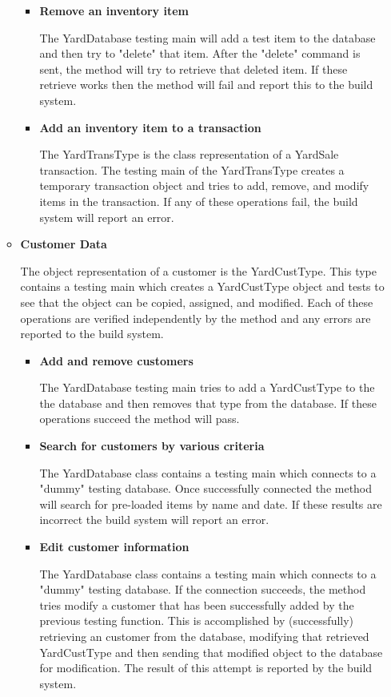 \documentclass{report}
\begin{document}
\begin{itemize}
\begin{itemize}
\begin{itemize}
                    \item {\textbf{Remove an inventory item}}

		    The YardDatabase testing main will add a test item to the database and then try to "delete" that item.
		    After the "delete" command is sent, the method will try to retrieve that deleted item. If these retrieve works
		    then the method will fail and report this to the build system.

		\item {\textbf{Add an inventory item to a transaction}}

		The YardTransType is the class representation of a YardSale transaction.  The testing main of the
		YardTransType creates a temporary transaction object and tries to add, remove, and modify items
		in the transaction.  If any of these operations fail, the build system will report an error.

                \end{itemize}
                \item{\textbf{Customer Data}}

		The object representation of a customer is the YardCustType.  This type contains a testing main which
		creates a YardCustType object and tests to see that the object can be copied, assigned, and modified.
		Each of these operations are verified independently by the method and any errors are reported to the build
		system.

                \begin{itemize}
                    \item{\textbf{Add and remove customers}}

		    The YardDatabase testing main tries to add a YardCustType to the the database and then removes that
		    type from the database.  If these operations succeed the method will pass.

                    \item{\textbf{Search for customers by various criteria}}

		The YardDatabase class contains a testing main which connects to a "dummy" testing database.
		 Once successfully connected the method will search for pre-loaded items by name and date.
		    If these results are incorrect the build system will report an error.

                    \item{\textbf{Edit customer information}}

		    The YardDatabase class contains a testing main which connects to a "dummy" testing database.
		    If the connection succeeds, the method tries modify a customer that has been successfully
		    added by the previous testing function.  This is accomplished by (successfully) retrieving an customer from the
		    database, modifying that retrieved YardCustType and then sending that modified object to the database
		    for modification.  The result of this attempt is reported by the build system.


\end{itemize}
\end{itemize}
\end{itemize}
\end{document}
